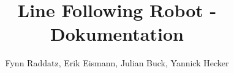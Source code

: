 \usepackage{siunitx}

\usepackage{enumitem}

\usepackage[dvipsnames]{xcolor}

\usepackage{listings, multicol}
\usepackage{tcolorbox}
\usetikzlibrary{shadings}

\usepackage{placeins}

\setcellgapes{5pt}
\makegapedcells


\usepackage{pgfplots}
\pgfplotsset{compat=1.17}

\usepackage[european,straightvoltages]{circuitikz}
\usetikzlibrary{calc}
\usetikzlibrary{patterns}

\usepackage{hhline}


\usepackage{mathtools}


\usepackage{fancybox,fancyhdr}
\pagestyle{plain}
\cfoot{\thepage}
\setlength{\headheight}{15pt}



\setcounter{secnumdepth}{5}
\setcounter{tocdepth}{5}

\usepackage[hyphens]{url}

\usepackage{hyperref}

\title{Line Following Robot - Dokumentation}
\author{Fynn Raddatz, Erik Eismann, Julian Buck, Yannick Hecker}
